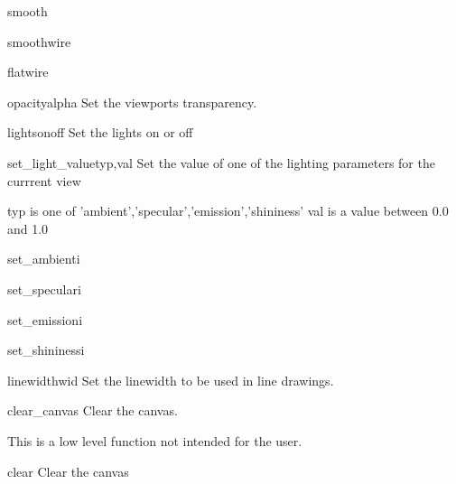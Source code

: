 \begin{funcdesc}{smooth}{}
\end{funcdesc}

\begin{funcdesc}{smoothwire}{}
\end{funcdesc}

\begin{funcdesc}{flatwire}{}
\end{funcdesc}

\begin{funcdesc}{opacity}{alpha}
Set the viewports transparency.
\end{funcdesc}

\begin{funcdesc}{lights}{onoff}
Set the lights on or off
\end{funcdesc}

\begin{funcdesc}{set_light_value}{typ,val}
Set the value of one of the lighting parameters for the currrent view

typ is one of 'ambient','specular','emission','shininess'
val is a value between 0.0 and 1.0

\end{funcdesc}

\begin{funcdesc}{set_ambient}{i}
\end{funcdesc}

\begin{funcdesc}{set_specular}{i}
\end{funcdesc}

\begin{funcdesc}{set_emission}{i}
\end{funcdesc}

\begin{funcdesc}{set_shininess}{i}
\end{funcdesc}

\begin{funcdesc}{linewidth}{wid}
Set the linewidth to be used in line drawings.
\end{funcdesc}

\begin{funcdesc}{clear_canvas}{}
Clear the canvas.

This is a low level function not intended for the user.

\end{funcdesc}

\begin{funcdesc}{clear}{}
Clear the canvas
\end{funcdesc}

